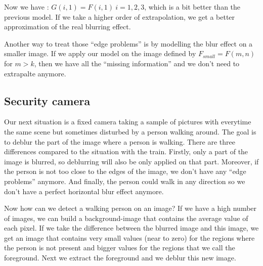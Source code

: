 Now we have : $G(i,1) = F(i,1)~i=1,2,3$, which is a bit better than the previous model. If we take a higher order of extrapolation, we get a better approximation of the real blurring effect.


Another way to treat those ``edge problems'' is by modelling the blur effect on a smaller image. If we apply our model on the image defined by $F_{small} = F(m,n)$ for $m>k$, then we have all the ``missing information'' and we don't need to extrapalte anymore.


\subsection{Security camera}

Our next situation is a fixed camera taking a sample of pictures with everytime the same scene but sometimes disturbed by a person walking around. The goal is to deblur the part of the image where a person is walking. There are three differences compared to the situation with the train. Firstly, only a part of the image is blurred, so deblurring will also be only applied on that part. Moreover, if the person is not too close to the edges of the image, we don't have any ``edge problems'' anymore. And finally, the person could walk in any direction so we don't have a perfect horizontal blur effect anymore.

Now how can we detect a walking person on an image? If we have a high number of images, we can build a background-image that contains the average value of each pixel. If we take the difference between the blurred image and this image, we get an image that contains very small values (near to zero) for the regions where the person is not present and bigger values for the regions that we call the foreground. Next we extract the foreground and we deblur this new image.

